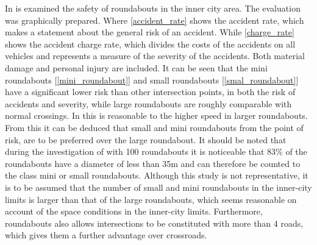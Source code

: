 In \cite{Baumert1998, brilon2002verkehrssicherheit, brilon2004uberprufung,voss1994verkehrssicherheit} is examined the safety of roundabouts in the inner city area.
The evaluation was graphically prepared. Where \cref{accident_rate} shows the accident rate, which makes a statement about the general risk of an accident.
While \cref{charge_rate} shows the accident charge rate, which divides the costs of the accidents on all vehicles and represents a measure of the severity of the accidents.
Both material damage and personal injury are included. It can be seen that the mini roundabouts [\cref{mini_roundabout}] and small roundabouts [\cref{smal_roundabout}] have a significant 
lower risk than other intersection points, in both the risk of accidents and severity, while large roundabouts are roughly comparable with normal crossings. 
In \cite{Bondzio2012} this is reasonable to the higher speed in larger roundabouts. From this it can be deduced that small and mini roundabouts from the point of risk,
are to be preferred over the large roundabout. It should be noted that during the investigation of \cite{Bondzio2012} with 100 roundabouts it is noticeable that 83\%
of the roundabouts have a diameter of less than 35m and can therefore be counted to the class mini or small roundabouts.
Although this study is not representative, it is to be assumed that the number of small and mini roundabouts in the inner-city limits is larger than that of the large roundabouts,
which seems reasonable on account of the space conditions in the inner-city limits.
Furthermore, roundabouts also allows intersections to be constituted with more than 4 roads, which gives them a further advantage over crossroads.

